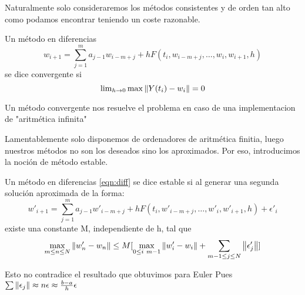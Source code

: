 Naturalmente solo consideraremos los métodos consistentes y de orden tan
alto como podamos encontrar teniendo un coste razonable.

\begin{definition}
    Un método en diferencias 
    \begin{equation} \label{eqn:diff}
        w_{i+1} = \sum_{j=1}^m {a_{j-1}w_{i-m+j}} + h F(t_i,w_{i-m+j}, \dots, w_i,w_{i+1},h)
    \end{equation}
    se dice convergente si 
    \begin{equation} \label{eqn:conv}
        \lim\nolimits_{h \to 0} \max{\norm{Y(t_i)-w_i}} = 0
    \end{equation}
\end{definition}

Un método convergente nos resuelve el problema en caso de una 
implementacion de "aritmética infinita"

Lamentablemente solo disponemos de ordenadores de aritmética finitia,
luego nuestros métodos no son los deseados sino los aproximados. %
Por eso, introducimos la noción de método estable. 

\begin{definition}
    Un método en diferencias \ref{eqn:diff} se dice estable si al generar
    una segunda solución aproximada de la forma:
    \begin{equation}
        w'_{i+1} = \sum_{j=1}^m {a_{j-1}w'_{i-m+j}} + h F(t_i,w'_{i-m+j}, \dots, w'_i,w'_{i+1},h) + \epsilon'_i
    \end{equation}
    existe una constante M, independiente de h, tal que
    \begin{equation} \label{stab}
        \max_{m \leq n \leq N}{\norm{w'_n - w_n}} \leq M[
            \max_{0 \leq i \ m-1}{\norm{w'_i - w_i}} + \sum_{m-1 \leq j \leq N} \norm{\epsilon'_j}
            ]
    \end{equation}
\end{definition}

\begin{remark}
    Esto no contradice el resultado que obtuvimos para Euler%
    Pues $\sum\norm{\epsilon_j} \approx n\epsilon \approx \frac{b-a}{h}\epsilon$%
\end{remark}


